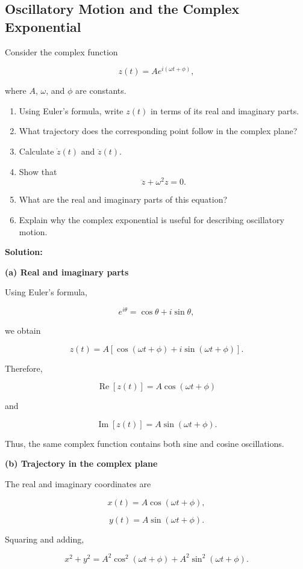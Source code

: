 \documentclass[../main.tex]{subfiles}
\theoremstyle{remark}
\begin{document}
\subsection{Oscillatory Motion and the Complex Exponential}

Consider the complex function

\[
z(t)=Ae^{i(\omega t+\phi)},
\]

where \(A\), \(\omega\), and \(\phi\) are constants.

\begin{enumerate}
    \item Using Euler's formula, write \(z(t)\) in terms of its real and imaginary parts.
    \item What trajectory does the corresponding point follow in the complex plane?
    \item Calculate \(\dot z(t)\) and \(\ddot z(t)\).
    \item Show that
    \[
    \ddot z+\omega^2 z=0.
    \]
    \item What are the real and imaginary parts of this equation?
    \item Explain why the complex exponential is useful for describing oscillatory motion.
\end{enumerate}

\textbf{Solution:}

\textbf{(a) Real and imaginary parts}

Using Euler's formula,

\[
e^{i\theta}
=
\cos\theta+i\sin\theta,
\]

we obtain

\[
z(t)
=
A\left[
\cos(\omega t+\phi)
+
i\sin(\omega t+\phi)
\right].
\]

Therefore,

\[
\boxed{
\operatorname{Re}[z(t)]
=
A\cos(\omega t+\phi)
}
\]

and

\[
\boxed{
\operatorname{Im}[z(t)]
=
A\sin(\omega t+\phi).
}
\]

Thus, the same complex function contains both sine and cosine oscillations.

\textbf{(b) Trajectory in the complex plane}

The real and imaginary coordinates are

\[
x(t)=A\cos(\omega t+\phi),
\]

\[
y(t)=A\sin(\omega t+\phi).
\]

Squaring and adding,

\[
x^2+y^2
=
A^2\cos^2(\omega t+\phi)
+
A^2\sin^2(\omega t+\phi).
\]
\end{document}
